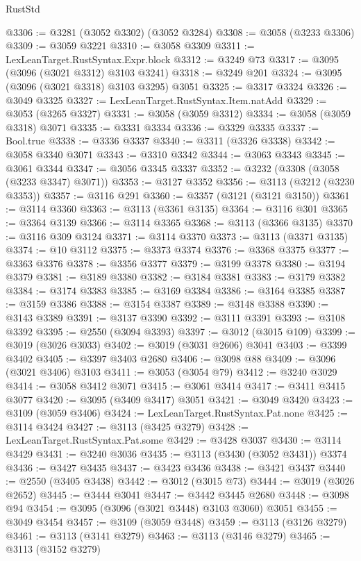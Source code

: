 \begin{lexlean}{RustStd}
\begin{coremodule}
@3306 := @3281 (@3052 @3302) (@3052 @3284)
@3308 := @3058 (@3233 @3306)
@3309 := @3059 @3221
@3310 := @3058 @3309
@3311 := LexLeanTarget.RustSyntax.Expr.block
@3312 := @3249 @73
@3317 := @3095 (@3096 (@3021 @3312) @3103 @3241)
@3318 := @3249 @201
@3324 := @3095 (@3096 (@3021 @3318) @3103 @3295) @3051
@3325 := @3317 @3324
@3326 := @3049 @3325
@3327 := LexLeanTarget.RustSyntax.Item.natAdd
@3329 := @3053 (@3265 @3327)
@3331 := @3058 (@3059 @3312)
@3334 := @3058 (@3059 @3318) @3071
@3335 := @3331 @3334
@3336 := @3329 @3335
@3337 := Bool.true
@3338 := @3336 @3337
@3340 := @3311 (@3326 @3338)
@3342 := @3058 @3340 @3071
@3343 := @3310 @3342
@3344 := @3063 @3343
@3345 := @3061 @3344
@3347 := @3056 @3345 @3337
@3352 := @3232 (@3308 (@3058 (@3233 @3347) @3071))
@3353 := @3127 @3352
@3356 := @3113 (@3212 (@3230 @3353))
@3357 := @3116 @291
@3360 := @3357 (@3121 (@3121 @3150))
@3361 := @3114 @3360
@3363 := @3113 (@3361 @3135)
@3364 := @3116 @301
@3365 := @3364 @3139
@3366 := @3114 @3365
@3368 := @3113 (@3366 @3135)
@3370 := @3116 @309 @3124
@3371 := @3114 @3370
@3373 := @3113 (@3371 @3135)
@3374 := @10 @3112
@3375 := @3373 @3374
@3376 := @3368 @3375
@3377 := @3363 @3376
@3378 := @3356 @3377
@3379 := @3199 @3378
@3380 := @3194 @3379
@3381 := @3189 @3380
@3382 := @3184 @3381
@3383 := @3179 @3382
@3384 := @3174 @3383
@3385 := @3169 @3384
@3386 := @3164 @3385
@3387 := @3159 @3386
@3388 := @3154 @3387
@3389 := @3148 @3388
@3390 := @3143 @3389
@3391 := @3137 @3390
@3392 := @3111 @3391
@3393 := @3108 @3392
@3395 := @2550 (@3094 @3393)
@3397 := @3012 (@3015 @109)
@3399 := @3019 (@3026 @3033)
@3402 := @3019 (@3031 @2606) @3041
@3403 := @3399 @3402
@3405 := @3397 @3403 @2680
@3406 := @3098 @88
@3409 := @3096 (@3021 @3406) @3103
@3411 := @3053 (@3054 @79)
@3412 := @3240 @3029
@3414 := @3058 @3412 @3071
@3415 := @3061 @3414
@3417 := @3411 @3415 @3077
@3420 := @3095 (@3409 @3417) @3051
@3421 := @3049 @3420
@3423 := @3109 (@3059 @3406)
@3424 := LexLeanTarget.RustSyntax.Pat.none
@3425 := @3114 @3424
@3427 := @3113 (@3425 @3279)
@3428 := LexLeanTarget.RustSyntax.Pat.some
@3429 := @3428 @3037
@3430 := @3114 @3429
@3431 := @3240 @3036
@3435 := @3113 (@3430 (@3052 @3431)) @3374
@3436 := @3427 @3435
@3437 := @3423 @3436
@3438 := @3421 @3437
@3440 := @2550 (@3405 @3438)
@3442 := @3012 (@3015 @73)
@3444 := @3019 (@3026 @2652)
@3445 := @3444 @3041
@3447 := @3442 @3445 @2680
@3448 := @3098 @94
@3454 := @3095 (@3096 (@3021 @3448) @3103 @3060) @3051
@3455 := @3049 @3454
@3457 := @3109 (@3059 @3448)
@3459 := @3113 (@3126 @3279)
@3461 := @3113 (@3141 @3279)
@3463 := @3113 (@3146 @3279)
@3465 := @3113 (@3152 @3279)

\end{coremodule}
\end{lexlean}
